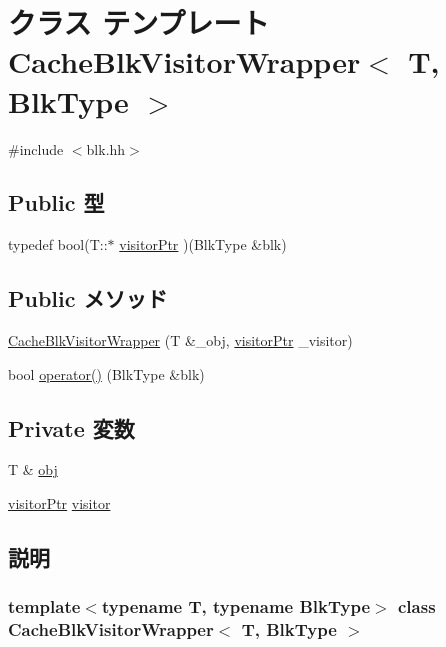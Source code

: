 \hypertarget{classCacheBlkVisitorWrapper}{
\section{クラス テンプレート CacheBlkVisitorWrapper$<$ T, BlkType $>$}
\label{classCacheBlkVisitorWrapper}
}


{\ttfamily \#include $<$blk.hh$>$}\subsection*{Public 型}
\begin{DoxyCompactItemize}
\item 
typedef bool(T::$\ast$ \hyperlink{classCacheBlkVisitorWrapper_a0bf73e583655a4e26c9b2ef77e4acfdd}{visitorPtr} )(BlkType \&blk)
\end{DoxyCompactItemize}
\subsection*{Public メソッド}
\begin{DoxyCompactItemize}
\item 
\hyperlink{classCacheBlkVisitorWrapper_a87ec4b04329314cd52a2c265f45c762b}{CacheBlkVisitorWrapper} (T \&\_\-obj, \hyperlink{classCacheBlkVisitorWrapper_a0bf73e583655a4e26c9b2ef77e4acfdd}{visitorPtr} \_\-visitor)
\item 
bool \hyperlink{classCacheBlkVisitorWrapper_af8429f9c21cde9e60c7fe57e0f14a0ef}{operator()} (BlkType \&blk)
\end{DoxyCompactItemize}
\subsection*{Private 変数}
\begin{DoxyCompactItemize}
\item 
T \& \hyperlink{classCacheBlkVisitorWrapper_a1beceed215cccbf241e8f38457cb5b35}{obj}
\item 
\hyperlink{classCacheBlkVisitorWrapper_a0bf73e583655a4e26c9b2ef77e4acfdd}{visitorPtr} \hyperlink{classCacheBlkVisitorWrapper_ad831ded64b7b13522af01fab27c30f50}{visitor}
\end{DoxyCompactItemize}


\subsection{説明}
\subsubsection*{template$<$typename T, typename BlkType$>$ class CacheBlkVisitorWrapper$<$ T, BlkType $>$}

